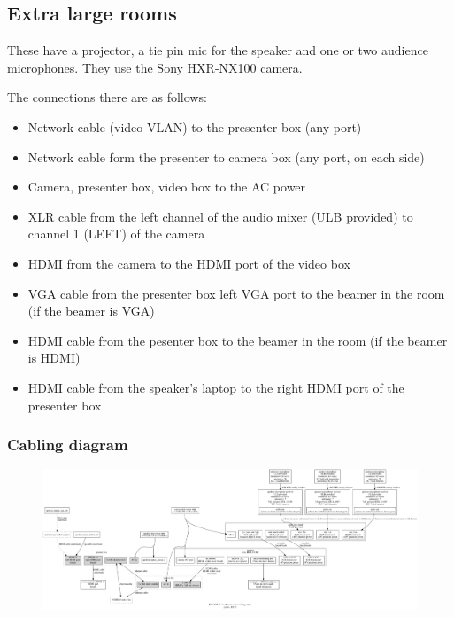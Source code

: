 \documentclass{article}
\begin{document}
\subsection{Extra large rooms}
These have a projector, a tie pin mic for the speaker and one or two audience microphones. They use the Sony HXR-NX100 camera. 

The connections there are as follows:

\begin{itemize}
  \item Network cable (video VLAN) to the presenter box (any port)
  \item Network cable form the presenter to camera box (any port, on each side)
  \item Camera, presenter box, video box to the AC power
  \item XLR cable from the left channel of the audio mixer (ULB provided) to channel 1 (LEFT) of the camera
  \item HDMI from the camera to the HDMI port of the video box
  \item VGA cable from the presenter box left VGA port to the beamer in the room (if the beamer is VGA)
  \item HDMI cable from the pesenter box to the beamer in the room (if the beamer is HDMI)
  \item HDMI cable from the speaker's laptop to the right HDMI port of the presenter box
\end{itemize}

\subsubsection{Cabling diagram}
\begin{figure}[H]
  \begin{sideways}
  \centering
  \includegraphics[width = 200mm]{../../graph/cabling_xxl_rooms.png}
  \end{sideways}
\end{figure}
\end{document}
